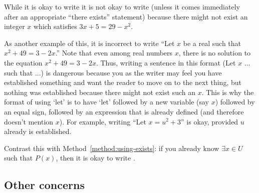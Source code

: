 \documentclass{book}
\theoremstyle{ekimcustom}
\begin{document}
\begin{bwarning}{}{}
While it is okay to write  it is not okay to write  (unless it comes immediately after an appropriate ``there exists'' statement) because there might not exist an integer $x$ which satisfies $3x + 5 = 29-x^2$.
\end{bwarning}
\begin{bwarning}{}{}
As another example of this, it is incorrect to write ``Let $x$ be a real such that $x^2+49 = 3-2x$.'' Note that even among real numbers $x$, there is no solution to the equation $x^2+49 = 3-2x$. Thus, writing a sentence in this format (Let $x$ ... such that ...) is dangerous because you as the writer may feel you have established something and want the reader to move on to the next thing, but nothing was established because there might not exist such an $x$. This is why the format of using `let' is to have `let' followed by a new variable (say $x$) followed by an equal sign, followed by an expression that is already defined (and therefore doesn't mention $x$). For example, writing ``Let $x=u^2+3$'' is okay, provided $u$ already is established.
\end{bwarning}

Contrast this with Method~\ref{method:using-exists}: if you already know $\exists x \in U$ such that $P(x)$, then it is okay to write .

\subsection{Other concerns}
\end{document}
